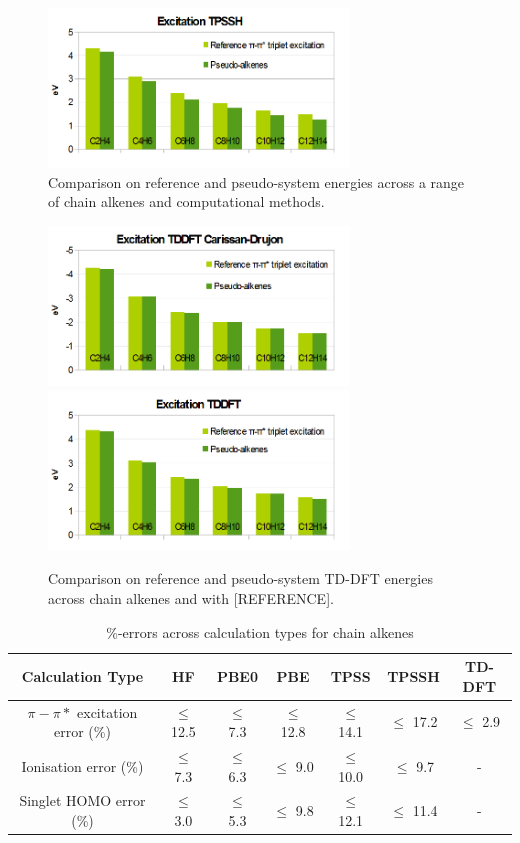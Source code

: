 \documentclass[journal=jctcce,manuscript=article]{achemso}
\begin{document}
\begin{figure}
\includegraphics[width=8cm]{tpssh_excitation}
\caption{Comparison on reference and pseudo-system energies across a range of chain alkenes and computational methods.}
\label{fig:alkenes_hf_dft}
\end{figure}
\begin{figure}
\includegraphics[width=8cm]{tddft_excitation_cd}
\includegraphics[width=8cm]{tddft_excitation}
\caption{Comparison on reference and pseudo-system TD-DFT energies across chain alkenes and with [REFERENCE].}
\label{fig:alkenes_tddft}
\end{figure}

\begin{table}[ht]
\caption{\%-errors across calculation types for chain alkenes}
\begin{tabular}{c c c c c c c}
\hline\hline
Calculation Type & HF & PBE0 & PBE & TPSS & TPSSH & TD-DFT \\
\hline
\(\pi - \pi*\) excitation error (\%) & \(\leq\) 12.5 &\(\leq\) 7.3 & \(\leq\) 12.8 & \(\leq\) 14.1 & \(\leq\) 17.2 & \(\leq\) 2.9 \\
Ionisation error (\%) & \(\leq\) 7.3 & \(\leq\) 6.3 & \(\leq\) 9.0 & \(\leq\) 10.0 & \(\leq\) 9.7 & - \\
Singlet HOMO error (\%) & \(\leq\) 3.0 & \(\leq\) 5.3 & \(\leq\) 9.8 & \(\leq\) 12.1 & \(\leq\) 11.4 & - \\
\hline
\end{tabular}
\label{table:alkene_errors}
\end{table}
\end{document}
